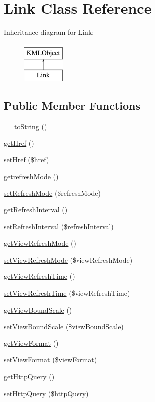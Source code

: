 \hypertarget{classLink}{
\section{Link Class Reference}
\label{d5/d19/classLink}
}
Inheritance diagram for Link:\begin{figure}[H]
\begin{center}
\leavevmode
\includegraphics[height=2.000000cm]{d5/d19/classLink}
\end{center}
\end{figure}
\subsection*{Public Member Functions}
\begin{DoxyCompactItemize}
\item 
\hyperlink{classLink_a697a2ff9eefcd90a71051ae58c6ca364}{\_\-\_\-toString} ()
\item 
\hyperlink{classLink_aee382b91ddaf73b3c0a5350179da763a}{getHref} ()
\item 
\hyperlink{classLink_a40a7adb08764f0a474846eb129781985}{setHref} (\$href)
\item 
\hyperlink{classLink_a8ecc44724fe4986e1f7ddbf4212dc8b5}{getrefreshMode} ()
\item 
\hyperlink{classLink_ab6bc55321d9eeaf34503d93fb71492ae}{setRefreshMode} (\$refreshMode)
\item 
\hyperlink{classLink_a6187b72b9ac95fc8de08bead8044c14f}{getRefreshInterval} ()
\item 
\hyperlink{classLink_ac696ced38960a2fab803c951c255c5c4}{setRefreshInterval} (\$refreshInterval)
\item 
\hyperlink{classLink_a8de11692897930191412f1557f2e68bc}{getViewRefreshMode} ()
\item 
\hyperlink{classLink_acd4305075ce6471e23259ab65f9b3a1d}{setViewRefreshMode} (\$viewRefreshMode)
\item 
\hyperlink{classLink_a2752ded925e81f37b7a2bc5b7ca99e15}{getViewRefreshTime} ()
\item 
\hyperlink{classLink_a19d1d0c75adbdeca83453b4c6ff408f5}{setViewRefreshTime} (\$viewRefreshTime)
\item 
\hyperlink{classLink_ace76c6fd6be1300e1dcd65c8f6848ac8}{getViewBoundScale} ()
\item 
\hyperlink{classLink_a987752d1c16008fd9e5bbd49036cb674}{setViewBoundScale} (\$viewBoundScale)
\item 
\hyperlink{classLink_a2e5bbb7c5f4da8a9777bb92262ea78a6}{getViewFormat} ()
\item 
\hyperlink{classLink_a9a225f04eb4434cd34532c245a675910}{setViewFormat} (\$viewFormat)
\item 
\hyperlink{classLink_aa9c60d34afb5c03c2390b035b9c78e2e}{getHttpQuery} ()
\item 
\hyperlink{classLink_ab48d29c19d5fdda1a31f389bf0ad7532}{setHttpQuery} (\$httpQuery)
\end{DoxyCompactItemize}
